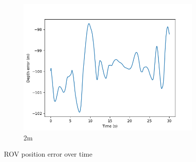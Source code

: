 \documentclass[class=article, crop=false]{standalone}
\begin{document}
\begin{figure}
\begin{subfigure}[b]{0.48\textwidth}
        \centering
        \includegraphics{scenario1/rov-0m/2.0m/rov_depth_error_controlled}
        \caption{2m}
        \label{}
    \end{subfigure}

    \caption{ROV position error over time}
\end{figure}
\end{document}
